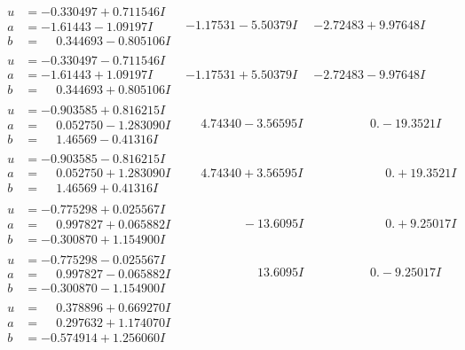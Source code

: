 \documentclass[1p]{elsarticle_modified}
\theoremstyle{definition}
\begin{document}
$$\begin{array}{c|c|c}
\begin{aligned}
u &= -0.330497 + 0.711546 I \\
a &= -1.61443 - 1.09197 I \\
b &= \phantom{-}0.344693 - 0.805106 I\end{aligned}
 & -1.17531 - 5.50379 I & -2.72483 + 9.97648 I \\ \hline\begin{aligned}
u &= -0.330497 - 0.711546 I \\
a &= -1.61443 + 1.09197 I \\
b &= \phantom{-}0.344693 + 0.805106 I\end{aligned}
 & -1.17531 + 5.50379 I & -2.72483 - 9.97648 I \\ \hline\begin{aligned}
u &= -0.903585 + 0.816215 I \\
a &= \phantom{-}0.052750 - 1.283090 I \\
b &= \phantom{-}1.46569 - 0.41316 I\end{aligned}
 & \phantom{-}4.74340 - 3.56595 I & \phantom{-0.000000 } 0. - 19.3521 I \\ \hline\begin{aligned}
u &= -0.903585 - 0.816215 I \\
a &= \phantom{-}0.052750 + 1.283090 I \\
b &= \phantom{-}1.46569 + 0.41316 I\end{aligned}
 & \phantom{-}4.74340 + 3.56595 I & \phantom{-0.000000 -}0. + 19.3521 I \\ \hline\begin{aligned}
u &= -0.775298 + 0.025567 I \\
a &= \phantom{-}0.997827 + 0.065882 I \\
b &= -0.300870 + 1.154900 I\end{aligned}
 & \phantom{-0.000000 } -13.6095 I & \phantom{-0.000000 -}0. + 9.25017 I \\ \hline\begin{aligned}
u &= -0.775298 - 0.025567 I \\
a &= \phantom{-}0.997827 - 0.065882 I \\
b &= -0.300870 - 1.154900 I\end{aligned}
 & \phantom{-0.000000 -}13.6095 I & \phantom{-0.000000 } 0. - 9.25017 I \\ \hline\begin{aligned}
u &= \phantom{-}0.378896 + 0.669270 I \\
a &= \phantom{-}0.297632 + 1.174070 I \\
b &= -0.574914 + 1.256060 I\end{aligned}

\end{array}$$
\end{document}
